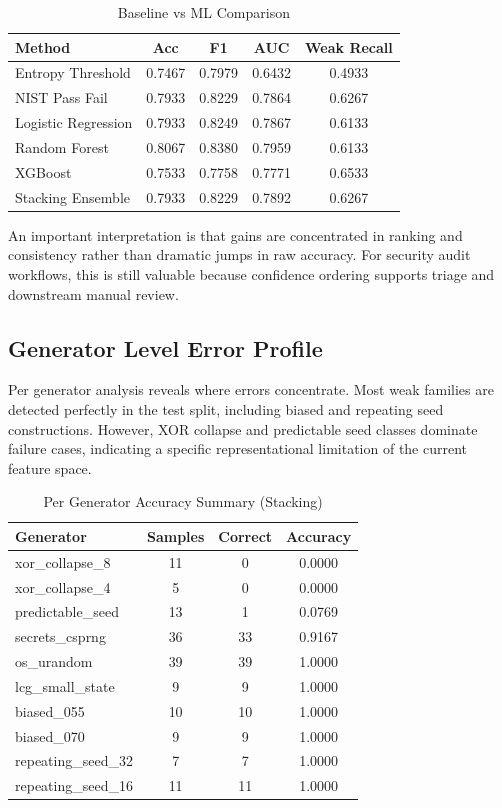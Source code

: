 \documentclass[conference]{IEEEtran}
\begin{document}
\begin{table}[htbp]
\caption{Baseline vs ML Comparison}
\label{tab:baseline_results}
\begin{center}
\begin{tabular}{|l|c|c|c|c|}
\hline
Method & Acc & F1 & AUC & Weak Recall \\
\hline
Entropy Threshold & 0.7467 & 0.7979 & 0.6432 & 0.4933 \\
NIST Pass Fail & 0.7933 & 0.8229 & 0.7864 & 0.6267 \\
Logistic Regression & 0.7933 & 0.8249 & 0.7867 & 0.6133 \\
Random Forest & 0.8067 & 0.8380 & 0.7959 & 0.6133 \\
XGBoost & 0.7533 & 0.7758 & 0.7771 & 0.6533 \\
Stacking Ensemble & 0.7933 & 0.8229 & 0.7892 & 0.6267 \\
\hline
\end{tabular}
\end{center}
\end{table}

An important interpretation is that gains are concentrated in ranking and consistency rather than dramatic jumps in raw accuracy. For security audit workflows, this is still valuable because confidence ordering supports triage and downstream manual review.

\subsection{Generator Level Error Profile}
Per generator analysis reveals where errors concentrate. Most weak families are detected perfectly in the test split, including biased and repeating seed constructions. However, XOR collapse and predictable seed classes dominate failure cases, indicating a specific representational limitation of the current feature space.

\begin{table}[htbp]
\caption{Per Generator Accuracy Summary (Stacking)}
\label{tab:gen_results}
\begin{center}
\begin{tabular}{|l|c|c|c|}
\hline
Generator & Samples & Correct & Accuracy \\
\hline
xor\_collapse\_8 & 11 & 0 & 0.0000 \\
xor\_collapse\_4 & 5 & 0 & 0.0000 \\
predictable\_seed & 13 & 1 & 0.0769 \\
secrets\_csprng & 36 & 33 & 0.9167 \\
os\_urandom & 39 & 39 & 1.0000 \\
lcg\_small\_state & 9 & 9 & 1.0000 \\
biased\_055 & 10 & 10 & 1.0000 \\
biased\_070 & 9 & 9 & 1.0000 \\
repeating\_seed\_32 & 7 & 7 & 1.0000 \\
repeating\_seed\_16 & 11 & 11 & 1.0000 \\
\hline
\end{tabular}
\end{center}
\end{table}
\end{document}
